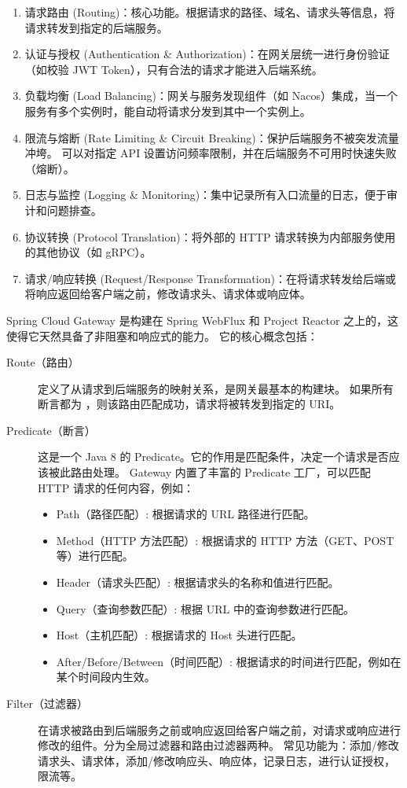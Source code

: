 \begin{enumerate}
    \item 请求路由 (Routing)：核心功能。根据请求的路径、域名、请求头等信息，将请求转发到指定的后端服务。 
    \item 认证与授权 (Authentication \& Authorization)：在网关层统一进行身份验证（如校验 JWT Token），只有合法的请求才能进入后端系统。
    \item 负载均衡 (Load Balancing)：网关与服务发现组件（如 Nacos）集成，当一个服务有多个实例时，能自动将请求分发到其中一个实例上。
    \item 限流与熔断 (Rate Limiting \& Circuit Breaking)：保护后端服务不被突发流量冲垮。
        可以对指定 API 设置访问频率限制，并在后端服务不可用时快速失败（熔断）。
    \item 日志与监控 (Logging \& Monitoring)：集中记录所有入口流量的日志，便于审计和问题排查。
    \item 协议转换 (Protocol Translation)：将外部的 HTTP 请求转换为内部服务使用的其他协议（如 gRPC）。
    \item 请求/响应转换 (Request/Response Transformation)：在将请求转发给后端或将响应返回给客户端之前，修改请求头、请求体或响应体。
\end{enumerate}

Spring Cloud Gateway 是构建在 Spring WebFlux 和 Project Reactor 之上的，这使得它天然具备了非阻塞和响应式的能力。
它的核心概念包括：
\begin{description}
    \item[Route（路由）] 定义了从请求到后端服务的映射关系，是网关最基本的构建块。
        如果所有断言都为 ，则该路由匹配成功，请求将被转发到指定的 URI。
    \item[Predicate（断言）] 这是一个 Java 8 的 Predicate。它的作用是匹配条件，决定一个请求是否应该被此路由处理。
        Gateway 内置了丰富的 Predicate 工厂，可以匹配 HTTP 请求的任何内容，例如：
        \begin{itemize}
            \item Path（路径匹配）: 根据请求的 URL 路径进行匹配。 
            \item Method（HTTP 方法匹配）: 根据请求的 HTTP 方法（GET、POST 等）进行匹配。
            \item Header（请求头匹配）: 根据请求头的名称和值进行匹配。
            \item Query（查询参数匹配）: 根据 URL 中的查询参数进行匹配。
            \item Host（主机匹配）: 根据请求的 Host 头进行匹配。
            \item After/Before/Between（时间匹配）: 根据请求的时间进行匹配，例如在某个时间段内生效。
        \end{itemize}
    \item[Filter（过滤器）] 在请求被路由到后端服务之前或响应返回给客户端之前，对请求或响应进行修改的组件。分为全局过滤器和路由过滤器两种。
        常见功能为：添加/修改请求头、请求体，添加/修改响应头、响应体，记录日志，进行认证授权，限流等。
\end{description}

